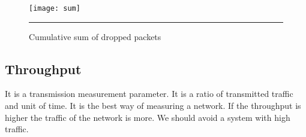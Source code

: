 \begin{figure}[htbp]
	\centering
	\texttt{[image: sum]}
	\rule{35em}{0.5pt}
	\caption[Cumulative sum of dropped packets]{Cumulative sum of dropped packets}
	\label{fig:sum}
\end{figure}


\subsection{Throughput}
It is a transmission measurement parameter. It is a ratio of transmitted traffic and unit of time. It is the best way of measuring a network. If the throughput is higher the traffic of the network is more. We should avoid a system with high traffic.

